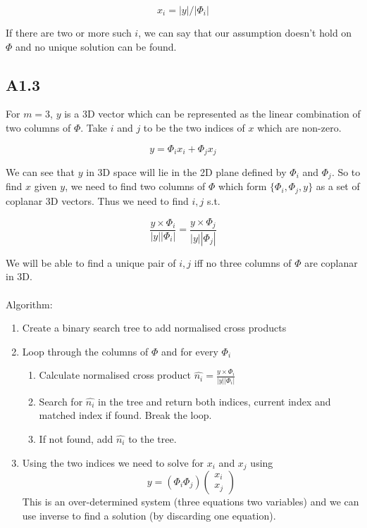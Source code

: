 \documentclass{article}
\begin{document}
$$x_i = |y|/|\Phi_i| $$

If there are two or more such $i$, we can say that our assumption doesn't hold on $\Phi$ and
no unique solution can be found.

\subsection*{A1.3}

For $m=3$, $y$ is a 3D vector which can be represented as the linear combination
of two columns of $\Phi$. Take $i$ and $j$ to be the two indices of $x$ which are
non-zero.

$$ y = \Phi_i x_i + \Phi_j x_j $$

We can see that $y$ in 3D space will lie in the 2D plane defined by $\Phi_i$ and
$\Phi_j$. So to find $x$ given $y$, we need to find two columns of $\Phi$ which form
$\{\Phi_i,\Phi_j,y\}$ as a set of coplanar 3D vectors. Thus we need to find $i,j$ s.t.

$$ \frac{y\times\Phi_i}{|y||\Phi_i|} = \frac{y\times\Phi_j}{|y||\Phi_j|} $$

We will be able to find a unique pair of $i,j$ iff no three columns of $\Phi$ are coplanar
in 3D.
\\
\\
Algorithm:
\begin{enumerate}
\item{Create a binary search tree to add normalised cross products}
\item{Loop through the columns of $\Phi$ and for every $\Phi_i$
    \begin{enumerate}
    \item{Calculate normalised cross product $\hat{n_i} =  \frac{y\times\Phi_i}{|y||\Phi_i|}$}
    \item{Search for $\hat{n_i}$ in the tree and return both indices,
        current index and matched index if found. Break the loop.}
    \item{If not found, add $\hat{n_i}$ to the tree.}
    \end{enumerate}
  }
\item{Using the two indices we need to solve for $x_i$ and $x_j$ using 
    $$y = (\Phi_i \Phi_j)\left(\begin{array}{c} x_i\\ x_j \end{array}\right) $$
    This is an over-determined system (three equations two variables)
    and we can use inverse to find a solution (by discarding one equation).}
\end{enumerate}
\end{document}
